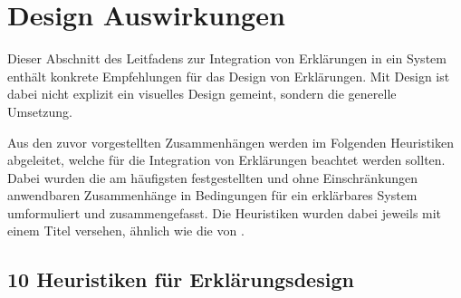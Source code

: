 \section{Design Auswirkungen}
\label{sec:model_design_implications}

Dieser Abschnitt des Leitfadens zur Integration von Erklärungen in ein System enthält konkrete Empfehlungen für das Design von Erklärungen. Mit Design ist dabei nicht explizit ein visuelles Design gemeint, sondern die generelle Umsetzung.

Aus den zuvor vorgestellten Zusammenhängen werden im Folgenden Heuristiken abgeleitet, welche für die Integration von Erklärungen beachtet werden sollten. Dabei wurden die am häufigsten festgestellten und ohne Einschränkungen anwendbaren Zusammenhänge in Bedingungen für ein erklärbares System umformuliert und zusammengefasst. Die Heuristiken wurden dabei jeweils mit einem Titel versehen, ähnlich wie die  von \citeauthor{nielsen10usability} \cite{nielsen10usability}.


\subsection*{10 Heuristiken für Erklärungsdesign}

